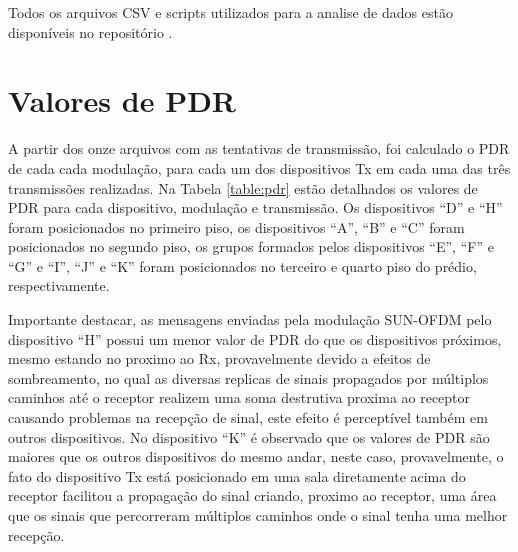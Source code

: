 Todos os arquivos CSV e scripts utilizados para a analise de dados estão disponíveis no repositório \cite{wisun-traces}.

\section{Valores de PDR}
A partir dos onze arquivos com as tentativas de transmissão, foi calculado o PDR de cada cada modulação, para cada um dos dispositivos Tx em cada uma das três transmissões realizadas. Na Tabela \ref{table:pdr} estão detalhados os valores de PDR para cada dispositivo, modulação e transmissão. Os dispositivos ``D'' e ``H'' foram posicionados no primeiro piso, os dispositivos ``A'', ``B'' e ``C'' foram posicionados no segundo piso, os grupos formados pelos dispositivos ``E'', ``F'' e ``G'' e ``I'', ``J'' e ``K'' foram posicionados no terceiro e quarto piso do prédio, respectivamente.

Importante destacar, as mensagens enviadas pela modulação SUN-OFDM pelo dispositivo ``H'' possui um menor valor de PDR do que os dispositivos próximos, mesmo estando no proximo ao Rx, provavelmente devido a efeitos de sombreamento, no qual as diversas replicas de sinais propagados por múltiplos caminhos até o receptor realizem uma soma destrutiva proxima ao receptor causando problemas na recepção de sinal, este efeito é perceptível também em outros dispositivos. No dispositivo ``K'' é observado que os valores de PDR são maiores que os outros dispositivos do mesmo andar, neste caso, provavelmente, o fato do dispositivo Tx está posicionado em uma sala diretamente acima do receptor facilitou a propagação do sinal criando, proximo ao receptor, uma área que os sinais que percorreram múltiplos caminhos onde o sinal tenha uma melhor recepção.


